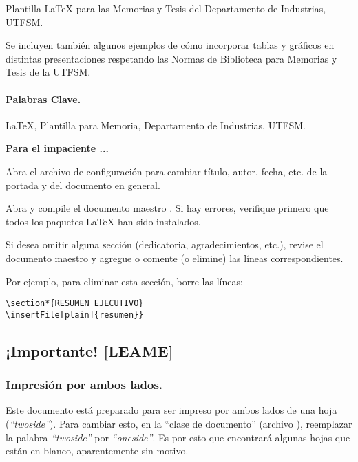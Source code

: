 
Plantilla \LaTeX{} para las Memorias y Tesis del Departamento de Industrias, UTFSM.

Se incluyen también algunos ejemplos de cómo incorporar tablas y gráficos en distintas presentaciones respetando las Normas de Biblioteca para Memorias y Tesis de la UTFSM.

\vspace{20mm}

\paragraph{Palabras Clave.}
\LaTeX{}, Plantilla para Memoria, Departamento de Industrias, UTFSM.

\vspace{10mm}

\begin{framed}
\noindent\textbf{\color{red}Para el impaciente ...}

Abra el archivo de configuración  para cambiar título, autor, fecha, etc. de la portada y del documento en general.

Abra  y compile el documento maestro . Si hay errores, verifique primero que todos los paquetes \LaTeX{} han sido instalados.

Si desea omitir alguna sección (dedicatoria, agradecimientos, etc.), revise el documento maestro  y agregue o comente (o elimine) las líneas correspondientes.

Por ejemplo, para eliminar esta sección, borre las líneas:

\begin{Verbatim}[frame=lines, label=\inlinecode{memoria.tex} (extracto)
, fontsize=\footnotesize
, baselinestretch=1
, formatcom=\color{gray}]
\section*{RESUMEN EJECUTIVO}
\insertFile[plain]{resumen}}
\end{Verbatim}
\end{framed}

\newpage
\subsection*{¡Importante! [LEAME]}

\subsubsection*{Impresión por ambos lados.}
Este documento está preparado para ser impreso por ambos lados de una hoja (\emph{``twoside''}). Para cambiar esto, en la ``clase de documento'' (archivo ), reemplazar la palabra \emph{``twoside''} por \emph{``oneside''}. Es por esto que encontrará algunas hojas que están en blanco, aparentemente sin motivo.


